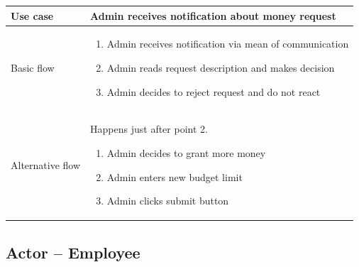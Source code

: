 \documentclass[licencjacka,en]{thesisclass}
\begin{document}
    \begin{center}
      \begin{tabular} {| l | p{13cm} |}
      \hline
      Use case & Admin receives notification about money request \\ \hline
      Basic flow &
        \begin{enumerate}
        \item Admin receives notification via mean of communication
        \item Admin reads request description and makes decision
        \item Admin decides to reject request and do not react
        \end{enumerate}
        \\ \hline
      Alternative flow &
        Happens just after point 2.
        \begin{enumerate}
        \item Admin decides to grant more money
        \item Admin enters new budget limit
        \item Admin clicks submit button
        \end{enumerate}
        \\ \hline
      \end{tabular}
    \end{center}

    \subsection{Actor -- Employee}
\end{document}
